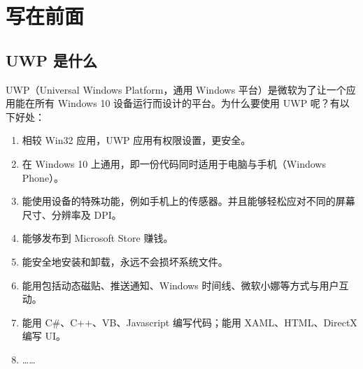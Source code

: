 




\section{写在前面}

\subsection{UWP 是什么}

UWP（Universal Windows Platform，通用 Windows 平台）是微软为了让一个应用能在所有 Windows 10 设备运行而设计的平台\cite{UWPbaidu}。为什么要使用 UWP 呢？有以下好处\cite{UWPMS}：

\begin{enumerate}
    \item 相较 Win32 应用，UWP 应用有权限设置，更安全。
    \item 在 Windows 10 上通用，即一份代码同时适用于电脑与手机（Windows Phone）。
    \item 能使用设备的特殊功能，例如手机上的传感器。并且能够轻松应对不同的屏幕尺寸、分辨率及 DPI。
    \item 能够发布到 Microsoft Store 赚钱。
    \item 能安全地安装和卸载，永远不会损坏系统文件。
    \item 能用包括动态磁贴、推送通知、Windows 时间线、微软小娜等方式与用户互动。
    \item 能用 C\#、C++、VB、Javascript 编写代码；能用 XAML、HTML、DirectX 编写 UI。
    \item ……
\end{enumerate}

